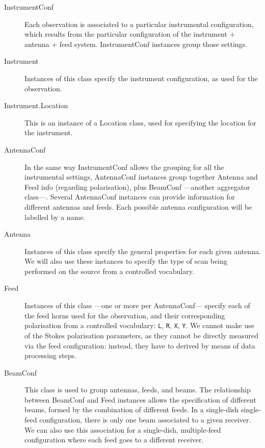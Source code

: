 		\begin{description}
			\item[InstrumentConf] Each observation is associated to
			a particular instrumental configuration, which results
			from the particular configuration of the instrument +
			antenna + feed system. InstrumentConf instances group
			those settings.
			
			 \item[Instrument] Instances of this class specify the
			instrument configuration, as used for the observation.
			
			 \item[Instrument.Location] This is an instance of a
			Location class, used for specifying the location for
			the instrument.
			
			 \item[AntennaConf] In the same way InstrumentConf
			allows the grouping for all the instrumental settings,
			AntennaConf instances group together Antenna and Feed
			info (regarding polarisation), plus BeamConf ---another
			aggregator class---. Several AntennaConf instances
			can provide information for different antennas and
			feeds. Each possible antenna configuration will be
			labelled by a name.
			
			 \item[Antenna] Instances of this class specify the
			general properties for each given antenna. We will also
			use these instances to specify the type of scan being
			performed on the source from a controlled vocabulary.
			
			 \item[Feed] Instances of this class ---one or more per
			AntennaConf--- specify each of the feed horns used for
			the observation, and their corresponding polarisation
			from a controlled vocabulary: \texttt{L}, \texttt{R},
			\texttt{X}, \texttt{Y}. We cannot make use of the
			Stokes polarisation parameters, as they cannot be
			directly measured via the feed configuration: instead,
			they have to derived by means of data processing steps.
			
			 \item[BeamConf] This class is used to group antennas,
			feeds, and beams. The relationship between BeamConf and
			Feed instances allows the specification of different
			beams, formed by the combination of different feeds. In
			a single-dish single-feed configuration, there is only
			one beam associated to a given receiver. We can also
			use this association for a single-dish, multiple-feed
			configuration where each feed goes to a different
			receiver.
			

\end{description}
